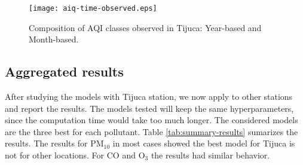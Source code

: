\begin{figure}
    \centering
    \texttt{[image: aiq-time-observed.eps]}
    \caption{Composition of AQI classes observed in Tijuca: Year-based and Month-based.}
    \label{fig:aqitime-observed}
\end{figure}

\subsection{Aggregated results}

After studying the models with Tijuca station, we now apply to other stations
and report the results. The models tested will keep the same hyperparameters,
since the computation time would take too much longer. The considered models
are the three best for each pollutant. Table \ref{tab:summary-results}
sumarizes the results. The results for PM$_{10}$ in most cases showed the
best model for Tijuca is not for other locations. For CO and O$_3$ the results
had similar behavior. 

